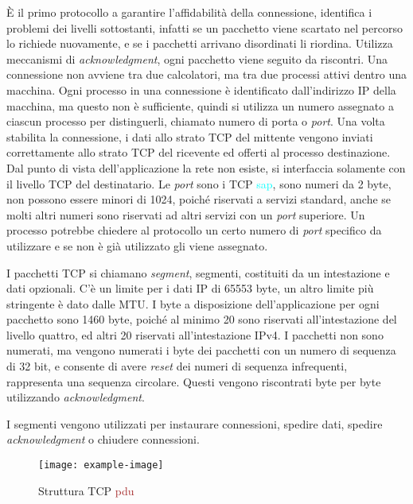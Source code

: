 \documentclass{article}
\numberwithin{equation}{subsection}
\begin{document}
\`{E} il primo protocollo a garantire l'affidabilità della connessione, identifica i problemi dei livelli sottostanti, infatti se un pacchetto viene scartato nel percorso lo 
richiede nuovamente, e se i pacchetti arrivano disordinati li riordina. Utilizza meccanismi di \textit{acknowledgment}, ogni pacchetto viene seguito da riscontri. Una 
connessione non avviene tra due calcolatori, ma tra due processi attivi dentro una macchina. Ogni processo in una connessione è identificato dall'indirizzo \textcolor{Bittersweet}{IP} della 
macchina, ma questo non è sufficiente, quindi si utilizza un numero assegnato a ciascun processo per distinguerli, chiamato numero di porta o \textit{port}. Una volta 
stabilita la connessione, i dati allo strato \textcolor{Bittersweet}{TCP} del mittente vengono inviati correttamente allo strato \textcolor{Bittersweet}{TCP} del ricevente ed offerti al processo destinazione. Dal punto di vista 
dell'applicazione la rete non esiste, si interfaccia solamente con il livello \textcolor{Bittersweet}{TCP} del destinatario. 
Le \textit{port} sono i \textcolor{Bittersweet}{TCP} {\textcolor{cyan}{sap}}, sono numeri da 2 byte, non possono essere minori di 1024, poiché riservati a servizi standard, anche se molti altri numeri sono riservati ad altri servizi con 
un \textit{port} superiore. 
Un processo potrebbe chiedere al protocollo un certo numero di \textit{port} specifico da utilizzare e se non è già utilizzato gli viene assegnato. 

I pacchetti \textcolor{Bittersweet}{TCP} si chiamano \textit{segment}, segmenti, costituiti da un intestazione e dati opzionali. C'è un limite per i dati \textcolor{Bittersweet}{IP} di 65553 byte, un altro limite più stringente 
è dato dalle \textcolor{RoyalPurple}{MTU}. I byte a disposizione dell'applicazione per ogni pacchetto sono 1460 byte, poiché al minimo 20 sono riservati all'intestazione del livello quattro, ed altri 20 riservati 
all'intestazione \textcolor{BurntOrange}{IPv4}. 
I pacchetti non sono numerati, ma vengono numerati i byte dei pacchetti con un numero di sequenza di 32 bit, e consente di avere \textit{reset} dei numeri di sequenza 
infrequenti, rappresenta una sequenza circolare. Questi vengono riscontrati byte per byte utilizzando \textit{acknowledgment}. 

I segmenti vengono utilizzati per instaurare connessioni, spedire dati, spedire \textit{acknowledgment} o chiudere connessioni. 

\begin{figure}[H]%
    \centering%
    \texttt{[image: example-image]}%
    \caption{Struttura \textcolor{Bittersweet}{TCP} \textcolor{Brown}{pdu}}%
\end{figure}
\end{document}
